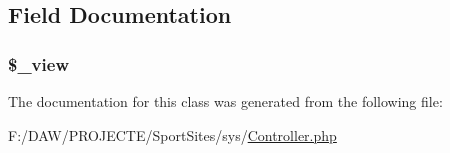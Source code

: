 \subsection{Field Documentation}
\hypertarget{class_controller_ab5859337f35d4f6ef52b6cf5eafd1795}{}
\subsubsection[{\$\+\_\+view}]{\setlength{\rightskip}{0pt plus 5cm}\$\+\_\+view\hspace{0.3cm}{\ttfamily [protected]}}\label{class_controller_ab5859337f35d4f6ef52b6cf5eafd1795}


The documentation for this class was generated from the following file\+:\begin{DoxyCompactItemize}
\item 
F\+:/\+D\+A\+W/\+P\+R\+O\+J\+E\+C\+T\+E/\+Sport\+Sites/sys/\hyperlink{_controller_8php}{Controller.\+php}\end{DoxyCompactItemize}
